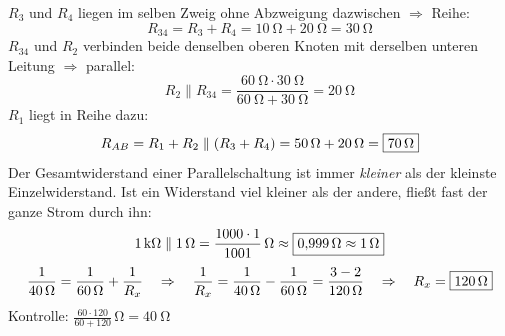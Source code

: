 \documentclass[11pt,a4paper]{article}
\begin{document}
\begin{loesung}
$R_3$ und $R_4$ liegen im selben Zweig ohne Abzweigung dazwischen $\Rightarrow$ Reihe:
\[ R_{34} = R_3 + R_4 = \SI{10}{\ohm} + \SI{20}{\ohm} = \SI{30}{\ohm} \]
$R_{34}$ und $R_2$ verbinden beide denselben oberen Knoten mit derselben unteren Leitung $\Rightarrow$ parallel:
\[ R_2\parallel R_{34} = \frac{\SI{60}{\ohm}\cdot\SI{30}{\ohm}}{\SI{60}{\ohm}+\SI{30}{\ohm}} = \SI{20}{\ohm} \]
$R_1$ liegt in Reihe dazu:
\[ R_{AB} = R_1 + R_2\parallel(R_3+R_4) = \SI{50}{\ohm} + \SI{20}{\ohm} = \boxed{\SI{70}{\ohm}} \]
Der Gesamtwiderstand einer Parallelschaltung ist immer \emph{kleiner} als der kleinste Einzelwiderstand. Ist ein Widerstand viel kleiner als der andere, fließt fast der ganze Strom durch ihn:
\[ \SI{1}{k\ohm}\parallel\SI{1}{\ohm} = \frac{1000\cdot 1}{1001}\,\si{\ohm} \approx \boxed{\SI{0.999}{\ohm}\approx\SI{1}{\ohm}} \]
\[ \frac{1}{\SI{40}{\ohm}} = \frac{1}{\SI{60}{\ohm}} + \frac{1}{R_x}
   \quad\Rightarrow\quad \frac{1}{R_x} = \frac{1}{40\,\Omega} - \frac{1}{60\,\Omega} = \frac{3-2}{120\,\Omega}
   \quad\Rightarrow\quad R_x = \boxed{\SI{120}{\ohm}} \]
Kontrolle: $\frac{60\cdot120}{60+120}\,\si{\ohm} = \SI{40}{\ohm}$ \checkmark
{}
\end{loesung}
\end{document}

